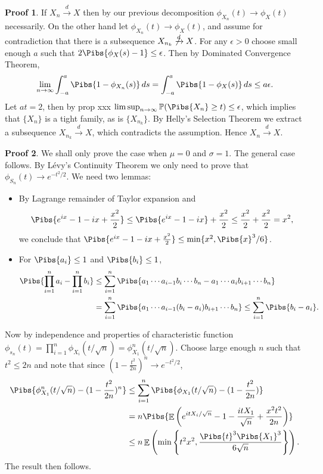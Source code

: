 \documentclass[hidelinks,11pt]{article}
\theoremstyle{definition}
\theoremstyle{dotless}
\newtheorem{prop}{Proof}[section]
\theoremstyle{remark}
\DeclareMathOperator{\E}{\mathbb{E}}
\DeclareMathOperator{\1}{\mathbf{1}}
\begin{document}
\begin{prop}
If $X_n\xrightarrow{d}X$ then by our previous decomposition $\phi_{X_n}(t)\to\phi_X(t)$ necessarily.\medbreak
On the other hand let $\phi_{X_n}(t)\to\phi_X(t)$, and assume for contradiction that there is a subsequence $X_{n_k}\not\xrightarrow{d}X$. For any $\epsilon>0$ choose small enough $a$ such that $2\Pibs{\phi_X(s)-1}\leq\epsilon$. Then by Dominated Convergence Theorem,
\[\lim_{n\to\infty}\int_{-a}^a\Pibs{1-\phi_{X_n}(s)}\,ds=\int_{-a}^a\Pibs{1-\phi_X(s)}\,ds\leq a\epsilon.\]
Let $at=2$, then by prop xxx $\limsup_{n\to\infty}\mathbb{P}(\Pibs{X_n}\geq t)\leq\epsilon$, which implies that $\{X_n\}$ is a tight family, as is $\{X_{n_k}\}$. By Helly's Selection Theorem we extract a subsequence $X_{n_k}\xrightarrow{d}X$, which contradicts the assumption. Hence $X_n\xrightarrow{d}X$.
\end{prop}

\begin{prop}
We shall only prove the case when $\mu=0$ and $\sigma=1$. The general case follows. By Lévy's Continuity Theorem we only need to prove that $\phi_{S_n}(t)\to e^{-t^2/2}$. We need two lemmas:\begin{itemize}
    \item By Lagrange remainder of Taylor expansion and
    \[\Pibs{e^{ix}-1-ix+\frac{x^2}{2}}\leq\Pibs{e^{ix}-1-ix}+\frac{x^2}{2}\leq\frac{x^2}{2}+\frac{x^2}{2}=x^2,\]
    we conclude that $\Pibs{e^{ix}-1-ix+\frac{x^2}{2}}\leq\min\{x^2,\Pibs{x}^3/6\}$.
    \item For $\Pibs{a_i}\leq1$ and $\Pibs{b_i}\leq1$,
    \begin{align*}
    \Pibs{\prod_{i=1}^na_i-\prod_{i=1}^nb_i}&\leq\sum_{i=1}^n\Pibs{a_1\cdots a_{i-1}b_i\cdots b_n-a_1\cdots a_ib_{i+1}\cdots b_n}\\
    &=\sum_{i=1}^n\Pibs{a_1\cdots a_{i-1}(b_i-a_i)b_{i+1}\cdots b_n}\leq\sum_{i=1}^n\Pibs{b_i-a_i}.
    \end{align*}
\end{itemize}
Now by independence and properties of characteristic function $\phi_{s_n}(t)=\prod_{i=1}^n\phi_{X_i}(t/\sqrt{n})=\phi_{X_1}^n(t/\sqrt{n})$. Choose large enough $n$ such that $t^2\leq2n$ and note that since $(1-\frac{t^2}{2n})^n\to e^{-t^2/2}$,
\begin{align*}
    \Pibs{\phi_{X_1}^n(t/\sqrt{n})-(1-\frac{t^2}{2n})^n}&\leq\sum_{i=1}^n\Pibs{\phi_{X_1}(t/\sqrt{n})-(1-\frac{t^2}{2n})}\\
    &=n\Pibs{\E\left(e^{itX_i/\sqrt{n}}-1-\frac{itX_1}{\sqrt{n}}+\frac{x^2t^2}{2n}\right)}\\
    &\leq n\E\left(\min\left\{t^2x^2,\frac{\Pibs{t}^3\Pibs{X_1}^3}{6\sqrt{n}}\right\}\right).
\end{align*}
The result then follows.
\end{prop}
\end{document}
